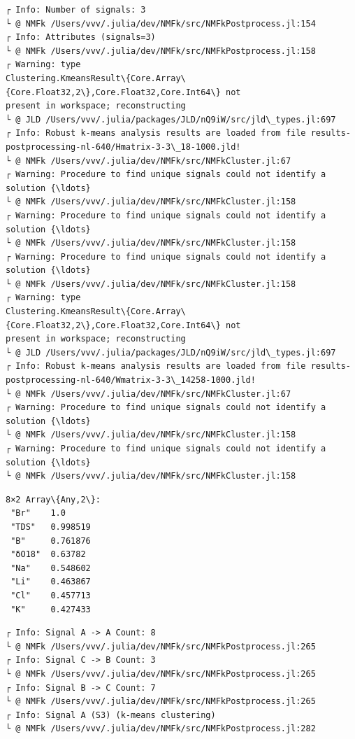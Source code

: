 \documentclass[11pt]{article}
\begin{document}
    \begin{Verbatim}[commandchars=\\\{\}]
┌ Info: Number of signals: 3
└ @ NMFk /Users/vvv/.julia/dev/NMFk/src/NMFkPostprocess.jl:154
┌ Info: Attributes (signals=3)
└ @ NMFk /Users/vvv/.julia/dev/NMFk/src/NMFkPostprocess.jl:158
┌ Warning: type
Clustering.KmeansResult\{Core.Array\{Core.Float32,2\},Core.Float32,Core.Int64\} not
present in workspace; reconstructing
└ @ JLD /Users/vvv/.julia/packages/JLD/nQ9iW/src/jld\_types.jl:697
┌ Info: Robust k-means analysis results are loaded from file results-
postprocessing-nl-640/Hmatrix-3-3\_18-1000.jld!
└ @ NMFk /Users/vvv/.julia/dev/NMFk/src/NMFkCluster.jl:67
┌ Warning: Procedure to find unique signals could not identify a solution {\ldots}
└ @ NMFk /Users/vvv/.julia/dev/NMFk/src/NMFkCluster.jl:158
┌ Warning: Procedure to find unique signals could not identify a solution {\ldots}
└ @ NMFk /Users/vvv/.julia/dev/NMFk/src/NMFkCluster.jl:158
┌ Warning: Procedure to find unique signals could not identify a solution {\ldots}
└ @ NMFk /Users/vvv/.julia/dev/NMFk/src/NMFkCluster.jl:158
┌ Warning: type
Clustering.KmeansResult\{Core.Array\{Core.Float32,2\},Core.Float32,Core.Int64\} not
present in workspace; reconstructing
└ @ JLD /Users/vvv/.julia/packages/JLD/nQ9iW/src/jld\_types.jl:697
┌ Info: Robust k-means analysis results are loaded from file results-
postprocessing-nl-640/Wmatrix-3-3\_14258-1000.jld!
└ @ NMFk /Users/vvv/.julia/dev/NMFk/src/NMFkCluster.jl:67
┌ Warning: Procedure to find unique signals could not identify a solution {\ldots}
└ @ NMFk /Users/vvv/.julia/dev/NMFk/src/NMFkCluster.jl:158
┌ Warning: Procedure to find unique signals could not identify a solution {\ldots}
└ @ NMFk /Users/vvv/.julia/dev/NMFk/src/NMFkCluster.jl:158
    \end{Verbatim}

    
    \begin{Verbatim}[commandchars=\\\{\}]
8×2 Array\{Any,2\}:
 "Br"    1.0
 "TDS"   0.998519
 "B"     0.761876
 "δO18"  0.63782
 "Na"    0.548602
 "Li"    0.463867
 "Cl"    0.457713
 "K"     0.427433
    \end{Verbatim}

    
    \begin{Verbatim}[commandchars=\\\{\}]
┌ Info: Signal A -> A Count: 8
└ @ NMFk /Users/vvv/.julia/dev/NMFk/src/NMFkPostprocess.jl:265
┌ Info: Signal C -> B Count: 3
└ @ NMFk /Users/vvv/.julia/dev/NMFk/src/NMFkPostprocess.jl:265
┌ Info: Signal B -> C Count: 7
└ @ NMFk /Users/vvv/.julia/dev/NMFk/src/NMFkPostprocess.jl:265
┌ Info: Signal A (S3) (k-means clustering)
└ @ NMFk /Users/vvv/.julia/dev/NMFk/src/NMFkPostprocess.jl:282
    \end{Verbatim}
\end{document}
